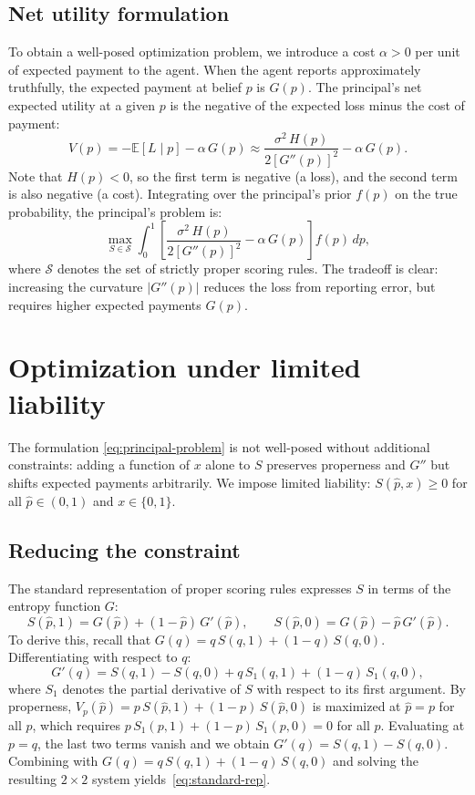 \documentclass[11pt]{article}
\begin{document}
\subsection{Net utility formulation}

To obtain a well-posed optimization problem, we introduce a cost $\alpha > 0$ per unit of expected payment to the agent. When the agent reports approximately truthfully, the expected payment at belief $p$ is $G(p)$.
The principal's net expected utility at a given $p$ is the negative of the expected loss minus the cost of payment:
\[
V(p) = -\mathbb{E}[L \mid p] - \alpha \, G(p) \approx \frac{\sigma^2 \, H(p)}{2[G''(p)]^2} - \alpha \, G(p).
\]
Note that $H(p) < 0$, so the first term is negative (a loss), and the second term is also negative (a cost). Integrating over the principal's prior $f(p)$ on the true probability, the principal's problem is:
\begin{equation}\label{eq:principal-problem}
\max_{S \in \mathcal{S}} \int_0^1 \left[ \frac{\sigma^2 \, H(p)}{2[G''(p)]^2} - \alpha \, G(p) \right] f(p) \, dp,
\end{equation}
where $\mathcal{S}$ denotes the set of strictly proper scoring rules. The tradeoff is clear: increasing the curvature $|G''(p)|$ reduces the loss from reporting error, but requires higher expected payments $G(p)$.

\section{Optimization under limited liability}\label{sec:limited-liability}

The formulation \eqref{eq:principal-problem} is not well-posed without additional constraints: adding a function of $x$ alone to $S$ preserves properness and $G''$ but shifts expected payments arbitrarily. We impose limited liability: $S(\hat{p}, x) \geq 0$ for all $\hat{p} \in (0,1)$ and $x \in \{0,1\}$.

\subsection{Reducing the constraint}\label{sec:reducing}

The standard representation of proper scoring rules expresses $S$ in terms of the entropy function $G$:
\begin{equation}\label{eq:standard-rep}
S(\hat{p}, 1) = G(\hat{p}) + (1-\hat{p})\,G'(\hat{p}), \qquad S(\hat{p}, 0) = G(\hat{p}) - \hat{p}\,G'(\hat{p}).
\end{equation}
To derive this, recall that $G(q) = q\,S(q,1) + (1-q)\,S(q,0)$. Differentiating with respect to $q$:
\[
G'(q) = S(q,1) - S(q,0) + q\,S_1(q,1) + (1-q)\,S_1(q,0),
\]
where $S_1$ denotes the partial derivative of $S$ with respect to its first argument. By properness, $V_p(\hat{p}) = p\,S(\hat{p},1) + (1-p)\,S(\hat{p},0)$ is maximized at $\hat{p} = p$ for all $p$, which requires $p\,S_1(p,1) + (1-p)\,S_1(p,0) = 0$ for all $p$. Evaluating at $p = q$, the last two terms vanish and we obtain $G'(q) = S(q,1) - S(q,0)$. Combining with $G(q) = q\,S(q,1) + (1-q)\,S(q,0)$ and solving the resulting $2 \times 2$ system yields~\eqref{eq:standard-rep}.
\end{document}
